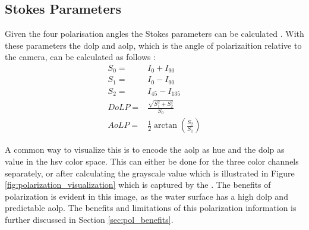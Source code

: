 \subsection{Stokes Parameters}
Given the four polarisation angles the Stokes parameters can be calculated \cite{piascoSurveyVisualBasedLocalization2018}.
With these parameters the \gls{dolp} and \gls{aolp}, which is the angle of polarizaition relative to the camera, can be calculated as follows \cite{piascoSurveyVisualBasedLocalization2018}:
\begin{align}
    S_0 =  & I_0 + I_{90}                                      \\
    S_1 =  & I_0 - I_{90}                                      \\
    S_2 =  & I_{45} - I_{135}                                  \\
    DoLP = & \frac{\sqrt{S_1^2 + S_2^2}}{S_0}                  \\
    AoLP = & \frac{1}{2} \arctan{\left(\frac{S_2}{S_1}\right)}
\end{align}

A common way to visualize this is to encode the \gls{aolp} as hue and the \gls{dolp} as value in the \gls{hsv} color space.
This can either be done for the three color channels separately, or after calculating the grayscale value which is illustrated in Figure \ref{fig:polarization_visualization} which is captured by the \sr.
The benefits of polarization is evident in this image, as the water surface has a high \gls{dolp} and predictable \gls{aolp}.
The benefits and limitations of this polarization information is further discussed in Section \ref{sec:pol_benefits}.

